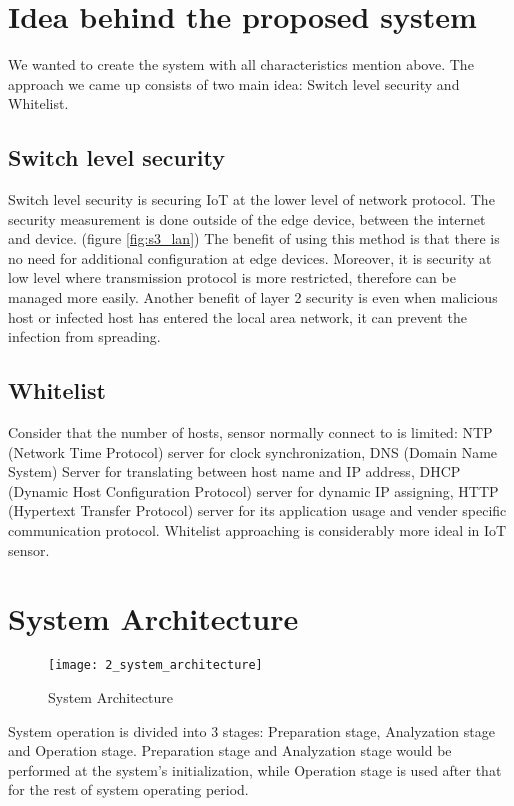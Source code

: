 \section{Idea behind the proposed system}
 
We wanted to create the system with all characteristics mention above. The approach we came up consists of two main idea: Switch level security and Whitelist.  

\subsection{Switch level security}
Switch level security is securing IoT at the lower level of network protocol. The security measurement is done outside of the edge device, between the internet and device. (figure \ref{fig:s3_lan}) The benefit of using this method is that there is no need for additional configuration at edge devices. Moreover, it is security at low level where transmission protocol is more restricted, therefore can be managed more easily. Another benefit of layer 2 security is even when malicious host or infected host has entered the local area network, it can prevent the infection from spreading. 

\subsection{Whitelist}
Consider that the number of hosts, sensor normally connect to is limited: NTP (Network Time Protocol) server for clock synchronization, DNS (Domain Name System) Server for translating between host name and IP address, DHCP (Dynamic Host Configuration Protocol) server for dynamic IP assigning, HTTP (Hypertext Transfer Protocol) server for its application usage and vender specific communication protocol. Whitelist approaching is considerably more ideal in IoT sensor.

\section{System Architecture}
\begin{figure}[h]
    \centering 
    \texttt{[image: 2\_system\_architecture]}
    \caption{System Architecture }
    \label{fig:s3_system_architecture} 
\end{figure}

System operation is divided into 3 stages: Preparation stage, Analyzation stage and Operation stage. Preparation stage and Analyzation stage would be performed at the system’s initialization, while Operation stage is used after that for the rest of system operating period.  

